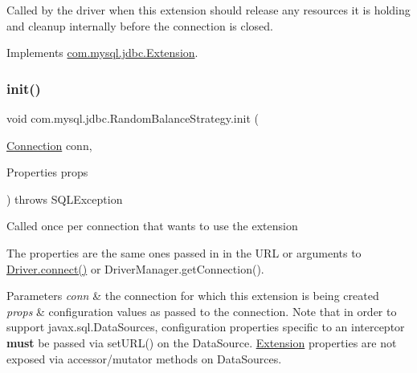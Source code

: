 Called by the driver when this extension should release any resources it is holding and cleanup internally before the connection is closed. 

Implements \mbox{\hyperlink{interfacecom_1_1mysql_1_1jdbc_1_1_extension_a7d9644de305efed5df71f3fcc7cc1772}{com.\+mysql.\+jdbc.\+Extension}}.

\mbox{\label{classcom_1_1mysql_1_1jdbc_1_1_random_balance_strategy_a748e276bd760d5671b7d6ee30c9c987f}} 
\subsubsection{\texorpdfstring{init()}{init()}}
{\footnotesize\ttfamily void com.\+mysql.\+jdbc.\+Random\+Balance\+Strategy.\+init (\begin{DoxyParamCaption}\item[{\mbox{\hyperlink{interfacecom_1_1mysql_1_1jdbc_1_1_connection}{Connection}}}]{conn,  }\item[{Properties}]{props }\end{DoxyParamCaption}) throws S\+Q\+L\+Exception}

Called once per connection that wants to use the extension

The properties are the same ones passed in in the U\+RL or arguments to \mbox{\hyperlink{classcom_1_1mysql_1_1jdbc_1_1_non_registering_driver_a834c012e752a01d1ee435b3461bb8218}{Driver.\+connect()}} or Driver\+Manager.\+get\+Connection().


\begin{DoxyParams}{Parameters}
{\em conn} & the connection for which this extension is being created \\
\hline
{\em props} & configuration values as passed to the connection. Note that in order to support javax.\+sql.\+Data\+Sources, configuration properties specific to an interceptor {\bfseries must} be passed via set\+U\+R\+L() on the Data\+Source. \mbox{\hyperlink{interfacecom_1_1mysql_1_1jdbc_1_1_extension}{Extension}} properties are not exposed via accessor/mutator methods on Data\+Sources.\\
\hline
\end{DoxyParams}


